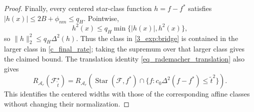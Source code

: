 \documentclass[twoside,11pt]{article}
\newenvironment{revision}{\color{revisionred}}{}
\begin{document}
\begin{revision}
\begin{proof}
Finally, every centered star-class function $h=f-f^*$ satisfies
$|h(x)|\leq2B+\phi_{nm}\leq q_H$. Pointwise,
\[
h^2(x)\leq q_H\min\{|h(x)|,h^2(x)\},
\]
so $\|h\|_2^2\leq q_H\Delta^2(h)$.
Thus the class in \eqref{3_exp:bridge} is contained in the
larger class in \eqref{c_final_rate}; taking the supremum over
that larger class gives the claimed bound.
The translation identity \eqref{eq_rademacher_translation} also gives
\[
R_{\mathcal A_r}(\mathcal F_{\tilde t}^{\star})
=R_{\mathcal A_r}\left(
\operatorname{Star}(\mathcal F,f^*)\cap
\{f:c_0\Delta^2(f-f^*)\leq\tilde t^2\}\right).
\]
This identifies the centered widths with those of the corresponding
affine classes without changing their normalization.
\end{proof}
\end{revision}











\end{document}
